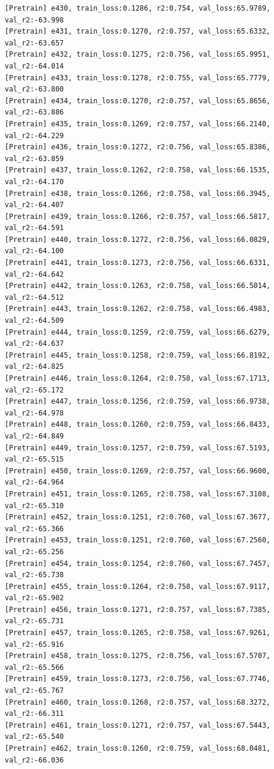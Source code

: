 \documentclass[a4paper, 12pt]{article}
\begin{document}
\begin{lstlisting}
[Pretrain] e430, train_loss:0.1286, r2:0.754, val_loss:65.9789, val_r2:-63.998
[Pretrain] e431, train_loss:0.1270, r2:0.757, val_loss:65.6332, val_r2:-63.657
[Pretrain] e432, train_loss:0.1275, r2:0.756, val_loss:65.9951, val_r2:-64.014
[Pretrain] e433, train_loss:0.1278, r2:0.755, val_loss:65.7779, val_r2:-63.800
[Pretrain] e434, train_loss:0.1270, r2:0.757, val_loss:65.8656, val_r2:-63.886
[Pretrain] e435, train_loss:0.1269, r2:0.757, val_loss:66.2140, val_r2:-64.229
[Pretrain] e436, train_loss:0.1272, r2:0.756, val_loss:65.8386, val_r2:-63.859
[Pretrain] e437, train_loss:0.1262, r2:0.758, val_loss:66.1535, val_r2:-64.170
[Pretrain] e438, train_loss:0.1266, r2:0.758, val_loss:66.3945, val_r2:-64.407
[Pretrain] e439, train_loss:0.1266, r2:0.757, val_loss:66.5817, val_r2:-64.591
[Pretrain] e440, train_loss:0.1272, r2:0.756, val_loss:66.0829, val_r2:-64.100
[Pretrain] e441, train_loss:0.1273, r2:0.756, val_loss:66.6331, val_r2:-64.642
[Pretrain] e442, train_loss:0.1263, r2:0.758, val_loss:66.5014, val_r2:-64.512
[Pretrain] e443, train_loss:0.1262, r2:0.758, val_loss:66.4983, val_r2:-64.509
[Pretrain] e444, train_loss:0.1259, r2:0.759, val_loss:66.6279, val_r2:-64.637
[Pretrain] e445, train_loss:0.1258, r2:0.759, val_loss:66.8192, val_r2:-64.825
[Pretrain] e446, train_loss:0.1264, r2:0.758, val_loss:67.1713, val_r2:-65.172
[Pretrain] e447, train_loss:0.1256, r2:0.759, val_loss:66.9738, val_r2:-64.978
[Pretrain] e448, train_loss:0.1260, r2:0.759, val_loss:66.8433, val_r2:-64.849
[Pretrain] e449, train_loss:0.1257, r2:0.759, val_loss:67.5193, val_r2:-65.515
[Pretrain] e450, train_loss:0.1269, r2:0.757, val_loss:66.9600, val_r2:-64.964
[Pretrain] e451, train_loss:0.1265, r2:0.758, val_loss:67.3108, val_r2:-65.310
[Pretrain] e452, train_loss:0.1251, r2:0.760, val_loss:67.3677, val_r2:-65.366
[Pretrain] e453, train_loss:0.1251, r2:0.760, val_loss:67.2560, val_r2:-65.256
[Pretrain] e454, train_loss:0.1254, r2:0.760, val_loss:67.7457, val_r2:-65.738
[Pretrain] e455, train_loss:0.1264, r2:0.758, val_loss:67.9117, val_r2:-65.902
[Pretrain] e456, train_loss:0.1271, r2:0.757, val_loss:67.7385, val_r2:-65.731
[Pretrain] e457, train_loss:0.1265, r2:0.758, val_loss:67.9261, val_r2:-65.916
[Pretrain] e458, train_loss:0.1275, r2:0.756, val_loss:67.5707, val_r2:-65.566
[Pretrain] e459, train_loss:0.1273, r2:0.756, val_loss:67.7746, val_r2:-65.767
[Pretrain] e460, train_loss:0.1268, r2:0.757, val_loss:68.3272, val_r2:-66.311
[Pretrain] e461, train_loss:0.1271, r2:0.757, val_loss:67.5443, val_r2:-65.540
[Pretrain] e462, train_loss:0.1260, r2:0.759, val_loss:68.0481, val_r2:-66.036

\end{lstlisting}
\end{document}
